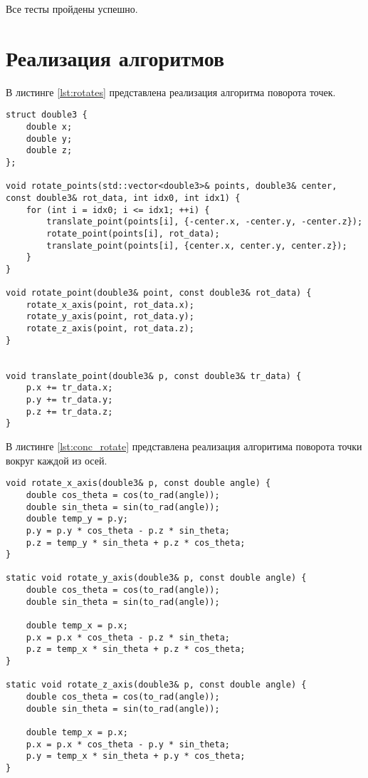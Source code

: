Все тесты пройдены успешно.

\section{Реализация алгоритмов}

В листинге \ref{lst:rotates} представлена реализация алгоритма поворота точек.
\begin{lstlisting}[label=lst:rotates,caption={Реализация алгоритма поворота точек}]
struct double3 {
    double x;
    double y;
    double z;
};

void rotate_points(std::vector<double3>& points, double3& center, const double3& rot_data, int idx0, int idx1) {
    for (int i = idx0; i <= idx1; ++i) {
        translate_point(points[i], {-center.x, -center.y, -center.z});
        rotate_point(points[i], rot_data);
        translate_point(points[i], {center.x, center.y, center.z});
    }
}

void rotate_point(double3& point, const double3& rot_data) {
    rotate_x_axis(point, rot_data.x);
    rotate_y_axis(point, rot_data.y);
    rotate_z_axis(point, rot_data.z);
}


void translate_point(double3& p, const double3& tr_data) {
    p.x += tr_data.x;
    p.y += tr_data.y;
    p.z += tr_data.z;
}
\end{lstlisting}

В листинге \ref{lst:conc_rotate} представлена реализация алгоритима поворота точки вокруг
каждой из осей.
\begin{lstlisting}[label=lst:conc_rotate,caption={Реализация алгоритма поворота точек}]
void rotate_x_axis(double3& p, const double angle) {
    double cos_theta = cos(to_rad(angle));
    double sin_theta = sin(to_rad(angle));
    double temp_y = p.y;
    p.y = p.y * cos_theta - p.z * sin_theta;
    p.z = temp_y * sin_theta + p.z * cos_theta;
}

static void rotate_y_axis(double3& p, const double angle) {
    double cos_theta = cos(to_rad(angle));
    double sin_theta = sin(to_rad(angle));

    double temp_x = p.x;
    p.x = p.x * cos_theta - p.z * sin_theta;
    p.z = temp_x * sin_theta + p.z * cos_theta;
}

static void rotate_z_axis(double3& p, const double angle) {
    double cos_theta = cos(to_rad(angle));
    double sin_theta = sin(to_rad(angle));

    double temp_x = p.x;
    p.x = p.x * cos_theta - p.y * sin_theta;
    p.y = temp_x * sin_theta + p.y * cos_theta;
}
\end{lstlisting}

